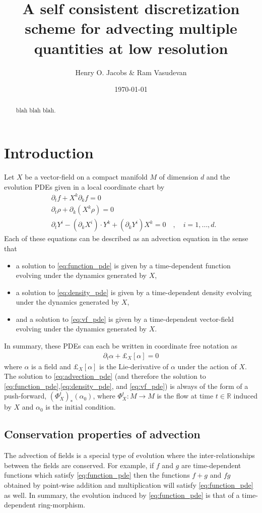 \documentclass[12pt]{amsart}
\title{A self consistent discretization scheme for advecting multiple quantities at low resolution}
\author{Henry O. Jacobs \& Ram Vasudevan}
\date{\today}
\newcommand{\R}{\ensuremath{\mathbb{R}}}
\begin{document}
\maketitle

\begin{abstract}
  blah blah blah.
\end{abstract}

\section{Introduction}
\label{sec:PDEs}
Let $X$ be a vector-field on a compact manifold $M$ of dimension $d$
and the evolution PDEs given in a local coordinate chart by
\begin{align}
	&\partial_t f + X^k \partial_k f= 0 \label{eq:function_pde} \\
	&\partial_t \rho + \partial_k( X^k \rho) = 0  \label{eq:density_pde} \\
	&\partial_t Y^i - (\partial_k X^i) \cdot Y^k + (\partial_k Y^i) X^k  = 0 \quad , \quad i = 1,\dots,d \label{eq:vf_pde}.
\end{align}
Each of these equations can be described as an advection equation in the sense that
\begin{itemize}
	\item a solution to \eqref{eq:function_pde} is given by a time-dependent function evolving under the dynamics generated by $X$,
	\item a solution to \eqref{eq:density_pde} is given by a time-dependent density evolving under the dynamics generated by $X$,
	\item and a solution to \eqref{eq:vf_pde} is given by a time-dependent vector-field evolving under the dynamics generated by $X$.
\end{itemize}
In summary, these PDEs can each be written in coordinate free notation as
\begin{align}
	\partial_t \alpha + \pounds_{X}[\alpha] = 0 \label{eq:advection_pde}
\end{align}
where $\alpha$ is a field and $\pounds_X[\alpha]$ is the Lie-derivative of $\alpha$ under the action of $X$.
The solution to \eqref{eq:advection_pde} (and therefore the solution to \eqref{eq:function_pde},\eqref{eq:density_pde}, and \eqref{eq:vf_pde}) is always of the form of a push-forward, $(\Phi_{X}^t)_* (\alpha_0)$, where $\Phi_{X}^t : M \to M$ is the flow at time $t \in \R$ induced by $X$ and $\alpha_0$ is the initial condition.

\subsection{Conservation properties of advection}
The advection of fields is a special type of evolution where the inter-relationships between the fields are conserved.
For example, if $f$ and $g$ are time-dependent functions which satisfy \eqref{eq:function_pde} then the functions $f+g$ and $fg$
obtained by point-wise addition and multiplication will satisfy \eqref{eq:function_pde} as well.
In summary, the evolution induced by \eqref{eq:function_pde} is that of a time-dependent ring-morphism.
\end{document}
